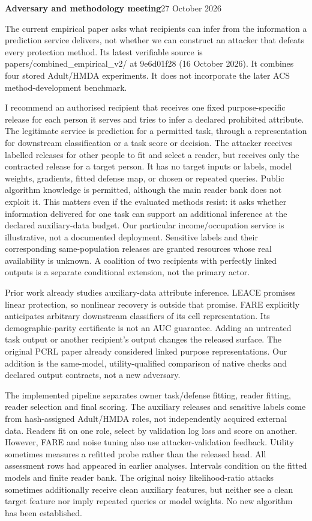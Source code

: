 \documentclass[10pt]{article}
\begin{document}
{\Large\bfseries Adversary and methodology meeting}\hfill 27 October 2026
\par
The current empirical paper asks what recipients can infer from the information a prediction service delivers, not whether we can construct an attacker that defeats every protection method. Its latest verifiable source is papers/combined\_empirical\_v2/ at 9e6d01f28 (16 October 2026). It combines four stored Adult/HMDA experiments. It does not incorporate the later ACS method-development benchmark.

I recommend an authorised recipient that receives one fixed purpose-specific release for each person it serves and tries to infer a declared prohibited attribute. The legitimate service is prediction for a permitted task, through a representation for downstream classification or a task score or decision. The attacker receives labelled releases for other people to fit and select a reader, but receives only the contracted release for a target person. It has no target inputs or labels, model weights, gradients, fitted defense map, or chosen or repeated queries. Public algorithm knowledge is permitted, although the main reader bank does not exploit it. This matters even if the evaluated methods resist: it asks whether information delivered for one task can support an additional inference at the declared auxiliary-data budget. Our particular income/occupation service is illustrative, not a documented deployment. Sensitive labels and their corresponding same-population releases are granted resources whose real availability is unknown. A coalition of two recipients with perfectly linked outputs is a separate conditional extension, not the primary actor.

Prior work already studies auxiliary-data attribute inference. LEACE promises linear protection, so nonlinear recovery is outside that promise. FARE explicitly anticipates arbitrary downstream classifiers of its cell representation. Its demographic-parity certificate is not an AUC guarantee. Adding an untreated task output or another recipient's output changes the released surface. The original PCRL paper already considered linked purpose representations. Our addition is the same-model, utility-qualified comparison of native checks and declared output contracts, not a new adversary.

The implemented pipeline separates owner task/defense fitting, reader fitting, reader selection and final scoring. The auxiliary releases and sensitive labels come from hash-assigned Adult/HMDA roles, not independently acquired external data. Readers fit on one role, select by validation log loss and score on another. However, FARE and noise tuning also use attacker-validation feedback. Utility sometimes measures a refitted probe rather than the released head. All assessment rows had appeared in earlier analyses. Intervals condition on the fitted models and finite reader bank. The original noisy likelihood-ratio attacks sometimes additionally receive clean auxiliary features, but neither see a clean target feature nor imply repeated queries or model weights. No new algorithm has been established.
\end{document}
